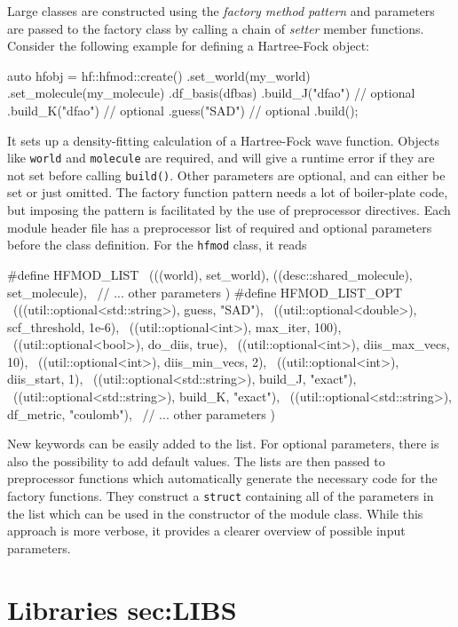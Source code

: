 Large classes are constructed using the \emph{factory method pattern} and parameters are passed to the factory class by calling a chain of \emph{setter} member functions. Consider the following example for defining a Hartree-Fock object:
\begin{cppinline}
auto hfobj = hf::hfmod::create()				 
 .set_world(my_world)
 .set_molecule(my_molecule)
 .df_basis(dfbas) 
 .build_J("dfao") // optional
 .build_K("dfao") // optional
 .guess("SAD")    // optional
 .build();
\end{cppinline}
\noindent It sets up a density-fitting calculation of a Hartree-Fock wave function. Objects like \texttt{world} and \texttt{molecule} are required, and will give a runtime error if they are not set before calling \texttt{build()}. Other parameters are optional, and can either be set or just omitted. The factory function pattern needs a lot of boiler-plate code, but imposing the pattern is facilitated by the use of preprocessor directives. Each module header file has a preprocessor list of required and optional parameters before the class definition. For the \texttt{hfmod} class, it reads
\begin{cppinline}
#define HFMOD_LIST \
  (((world), set_world), 
   ((desc::shared_molecule), set_molecule), \
   // ... other parameters
  )
#define HFMOD_LIST_OPT \
  (((util::optional<std::string>), guess, "SAD"), \
   ((util::optional<double>), scf_threshold, 1e-6), \
   ((util::optional<int>), max_iter, 100), \
   ((util::optional<bool>), do_diis, true), \
   ((util::optional<int>), diis_max_vecs, 10), \
   ((util::optional<int>), diis_min_vecs, 2), \
   ((util::optional<int>), diis_start, 1), \
   ((util::optional<std::string>), build_J, "exact"), \
   ((util::optional<std::string>), build_K, "exact"), \
   ((util::optional<std::string>), df_metric, "coulomb"), \
   // ... other parameters
   )
\end{cppinline}

\noindent New keywords can be easily added to the list. For optional parameters, there is also the possibility to add default values. The lists are then passed to preprocessor functions which automatically generate the necessary code for the factory functions. They construct a \texttt{struct} containing all of the parameters in the list which can be used in the constructor of the module class. While this approach is more verbose, it provides a clearer overview of possible input parameters. 

\section{Libraries sec:LIBS}

